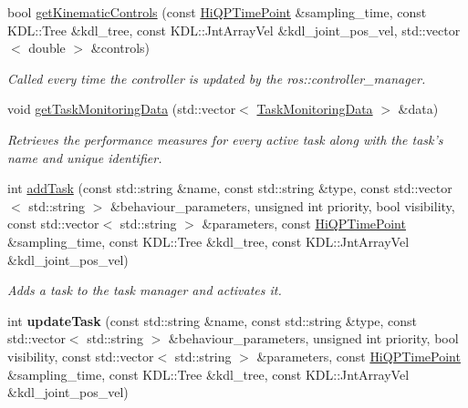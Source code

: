\begin{DoxyCompactItemize}
\item 
bool \hyperlink{classhiqp_1_1TaskManager_a077ffe75d41dd8be2c728824d93207ce}{get\-Kinematic\-Controls} (const \hyperlink{classhiqp_1_1HiQPTimePoint}{Hi\-Q\-P\-Time\-Point} \&sampling\-\_\-time, const K\-D\-L\-::\-Tree \&kdl\-\_\-tree, const K\-D\-L\-::\-Jnt\-Array\-Vel \&kdl\-\_\-joint\-\_\-pos\-\_\-vel, std\-::vector$<$ double $>$ \&controls)
\begin{DoxyCompactList}\small\item\em Called every time the controller is updated by the ros\-::controller\-\_\-manager. \end{DoxyCompactList}\item 
void \hyperlink{classhiqp_1_1TaskManager_a96169e24a3972b61eab9d0e15fdf723c}{get\-Task\-Monitoring\-Data} (std\-::vector$<$ \hyperlink{classhiqp_1_1TaskMonitoringData}{Task\-Monitoring\-Data} $>$ \&data)
\begin{DoxyCompactList}\small\item\em Retrieves the performance measures for every active task along with the task's name and unique identifier. \end{DoxyCompactList}\item 
int \hyperlink{classhiqp_1_1TaskManager_a6ae5db3755ca5231a99b1b0c5f06e00d}{add\-Task} (const std\-::string \&name, const std\-::string \&type, const std\-::vector$<$ std\-::string $>$ \&behaviour\-\_\-parameters, unsigned int priority, bool visibility, const std\-::vector$<$ std\-::string $>$ \&parameters, const \hyperlink{classhiqp_1_1HiQPTimePoint}{Hi\-Q\-P\-Time\-Point} \&sampling\-\_\-time, const K\-D\-L\-::\-Tree \&kdl\-\_\-tree, const K\-D\-L\-::\-Jnt\-Array\-Vel \&kdl\-\_\-joint\-\_\-pos\-\_\-vel)
\begin{DoxyCompactList}\small\item\em Adds a task to the task manager and activates it. \end{DoxyCompactList}\item 
\hypertarget{classhiqp_1_1TaskManager_aa8248ca15ed12ab7d2dd7b77fb6250e8}{int {\bfseries update\-Task} (const std\-::string \&name, const std\-::string \&type, const std\-::vector$<$ std\-::string $>$ \&behaviour\-\_\-parameters, unsigned int priority, bool visibility, const std\-::vector$<$ std\-::string $>$ \&parameters, const \hyperlink{classhiqp_1_1HiQPTimePoint}{Hi\-Q\-P\-Time\-Point} \&sampling\-\_\-time, const K\-D\-L\-::\-Tree \&kdl\-\_\-tree, const K\-D\-L\-::\-Jnt\-Array\-Vel \&kdl\-\_\-joint\-\_\-pos\-\_\-vel)}\label{classhiqp_1_1TaskManager_aa8248ca15ed12ab7d2dd7b77fb6250e8}


\end{DoxyCompactItemize}
